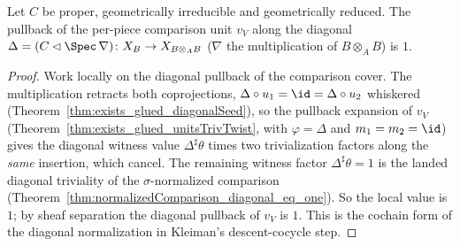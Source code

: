 \begin{theorem}
  \label{thm:pieceComparisonUnit_diagonal_eq_one}
  \leanok
  Let \(C\) be proper, geometrically irreducible and geometrically reduced. The pullback of the
  per-piece comparison unit \(v_V\) along the diagonal \(\Delta = (C \lhd \Spec\, \nabla) \colon X_B
  \to X_{B \otimes_A B}\) (\(\nabla\) the multiplication of \(B \otimes_A B\)) is \(1\).
\end{theorem}
\begin{proof}
  \leanok
  Work locally on the diagonal pullback of the comparison cover. The multiplication retracts both
  coprojections, \(\Delta \circ u_1 = \id = \Delta \circ u_2\) whiskered
  (Theorem~\ref{thm:exists_glued_diagonalSeed}), so the pullback expansion of \(v_V\)
  (Theorem~\ref{thm:exists_glued_unitsTrivTwist}, with \(\varphi = \Delta\) and \(m_1 = m_2 = \id\))
  gives the diagonal witness value \(\Delta^{\sharp}\theta\) times two trivialization factors along
  the \emph{same} insertion, which cancel. The remaining witness factor \(\Delta^{\sharp}\theta = 1\)
  is the landed diagonal triviality of the \(\sigma\)-normalized comparison
  (Theorem~\ref{thm:normalizedComparison_diagonal_eq_one}). So the local value is \(1\); by sheaf
  separation the diagonal pullback of \(v_V\) is \(1\). This is the cochain form of the diagonal
  normalization in Kleiman's descent-cocycle step.
\end{proof}

